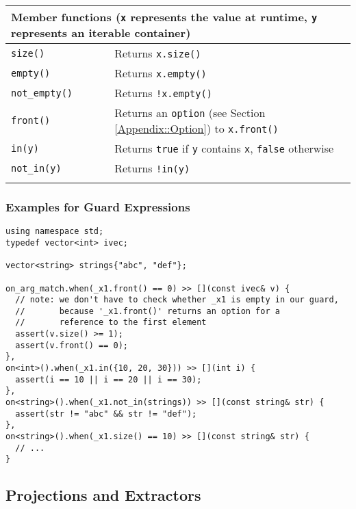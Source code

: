 \begin{tabular*}{\textwidth}{m{0.3\linewidth}m{0.7\linewidth}}
  \multicolumn{2}{m{\linewidth}}{\large{\textbf{Member functions} \small{(\lstinline^x^ represents the value at runtime, \lstinline^y^ represents an iterable container)}}\vspace{3pt}} \\
  \hline
  \lstinline^size()^ & Returns \lstinline^x.size()^ \\
  \hline
  \lstinline^empty()^ & Returns \lstinline^x.empty()^ \\
  \hline
  \lstinline^not_empty()^ & Returns \lstinline^!x.empty()^ \\
  \hline
  \lstinline^front()^ & Returns an \lstinline^option^ (see Section \ref{Appendix::Option}) to \lstinline^x.front()^  \\
  \hline
  \lstinline^in(y)^ & Returns \lstinline^true^ if \lstinline^y^ contains \lstinline^x^, \lstinline^false^ otherwise\\
  \hline
  \lstinline^not_in(y)^ & Returns \lstinline^!in(y)^  \\
  \hline
  \\
\end{tabular*}

\subsubsection{Examples for Guard Expressions}

\begin{lstlisting}
using namespace std;
typedef vector<int> ivec;

vector<string> strings{"abc", "def"};

on_arg_match.when(_x1.front() == 0) >> [](const ivec& v) {
  // note: we don't have to check whether _x1 is empty in our guard,
  //       because '_x1.front()' returns an option for a 
  //       reference to the first element
  assert(v.size() >= 1);
  assert(v.front() == 0);
},
on<int>().when(_x1.in({10, 20, 30})) >> [](int i) {
  assert(i == 10 || i == 20 || i == 30);
},
on<string>().when(_x1.not_in(strings)) >> [](const string& str) {
  assert(str != "abc" && str != "def");
},
on<string>().when(_x1.size() == 10) >> [](const string& str) {
  // ...
}
\end{lstlisting}

\subsection{Projections and Extractors}

